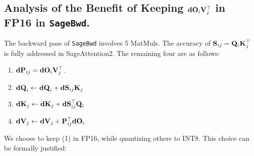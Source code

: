 








\subsection{Analysis of the Benefit of Keeping $\mathbf{dO}_i\mathbf{V}_j^\top$ in FP16 in \texttt{SageBwd}.}

The backward pass of \texttt{SageBwd} involves 5 MatMuls. The accuracy of $\mathbf{S}_{ij}=\mathbf{Q}_i\mathbf{K}_j^\top$ is fully addressed in SageAttention2. The remaining four are as follows:

\begin{enumerate}
    \item[(1)] $\mathbf{dP}_{ij}=\mathbf{dO}_i\mathbf{V}_j^\top$.
    \item[(2)] $\mathbf{dQ}_i\gets\mathbf{dQ}_i+\mathbf{dS}_{ij}\mathbf{K}_j$
    \item[(3)] $\mathbf{dK}_j\gets\mathbf{dK}_j+\mathbf{dS}_{ij}^\top\mathbf{Q}_i$
    \item[(4)] $\mathbf{dV}_j\gets\mathbf{dV}_j+\mathbf{P}_{ij}^\top\mathbf{dO}_i$
\end{enumerate}

We choose to keep (1) in FP16, while quantizing others to INT8. This choice can be formally justified:

